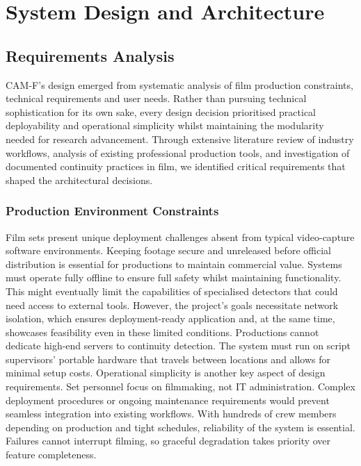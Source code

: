 \chapter{System Design and Architecture}
\label{ch:design}
\section{Requirements Analysis}
CAM-F's design emerged from systematic analysis of film production constraints, technical requirements and user needs. Rather than pursuing technical sophistication for its own sake, every design decision prioritised practical deployability and operational simplicity whilst maintaining the modularity needed for research advancement. Through extensive literature review of industry workflows, analysis of existing professional production tools, and investigation of documented continuity practices in film, we identified critical requirements that shaped the architectural decisions.
\subsection{Production Environment Constraints}
Film sets present unique deployment challenges absent from typical video-capture software environments. Keeping footage secure and unreleased before official distribution is essential for productions to maintain commercial value. Systems must operate fully offline to ensure full safety whilst maintaining functionality. This might eventually limit the capabilities of specialised detectors that could need access to external tools. However, the project's goals necessitate network isolation, which ensures deployment-ready application and, at the same time, showcases feasibility even in these limited conditions. 
Productions cannot dedicate high-end servers to continuity detection. The system must run on script supervisors' portable hardware that travels between locations and allows for minimal setup costs. Operational simplicity is another key aspect of design requirements. Set personnel focus on filmmaking, not IT administration. Complex deployment procedures or ongoing maintenance requirements would prevent seamless integration into existing workflows. With hundreds of crew members depending on production and tight schedules, reliability of the system is essential. Failures cannot interrupt filming, so graceful degradation takes priority over feature completeness.
